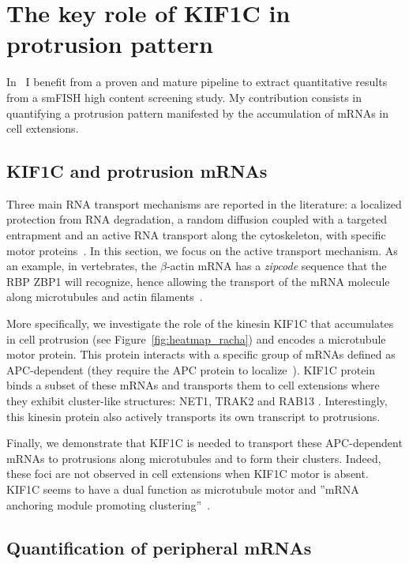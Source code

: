 \section{The key role of KIF1C in protrusion pattern}
\label{sec:protrusion}

In~\cite{pichon_kinesin_2021} I benefit from a proven and mature pipeline to extract quantitative results from a \ac{smFISH} high content screening study.
My contribution consists in quantifying a protrusion pattern manifested by the accumulation of \ac{mRNA}s in cell extensions.

\subsection{KIF1C and protrusion mRNAs}
\label{subsec:introduction_protrusion}

Three main \ac{RNA} transport mechanisms are reported in the literature: a localized protection from \ac{RNA} degradation, a random diffusion coupled with a targeted entrapment and an active \ac{RNA} transport along the cytoskeleton, with specific motor proteins~\cite{Medioni_2012, Bovaird_2018}.
In this section, we focus on the active transport mechanism.
As an example, in vertebrates, the $\beta$-actin \ac{mRNA} has a \emph{zipcode} sequence that the \ac{RBP} ZBP1 will recognize, hence allowing the transport of the \ac{mRNA} molecule along microtubules and actin filaments~\cite{Oleynikov_2003}.

More specifically, we investigate the role of the kinesin KIF1C that accumulates in cell protrusion (see Figure~\ref{fig:heatmap_racha}) and encodes a microtubule motor protein.
This protein interacts with a specific group of \ac{mRNA}s defined as APC-dependent (they require the APC protein to localize~\cite{wang_extracellular_2017}).
KIF1C protein binds a subset of these \ac{mRNA}s and transports them to cell extensions where they exhibit cluster-like structures: NET1, TRAK2 and RAB13 .
Interestingly, this kinesin protein also actively transports its own transcript to protrusions.

Finally, we demonstrate that KIF1C is needed to transport these APC-dependent \ac{mRNA}s to protrusions along microtubules and to form their clusters.
Indeed, these foci are not observed in cell extensions when KIF1C motor is absent.
KIF1C seems to have a dual function as microtubule motor and ''\ac{mRNA} anchoring module promoting clustering''~\cite{pichon_kinesin_2021}.

\subsection{Quantification of peripheral mRNAs}
\label{subsec:materials_results_protrusion}

